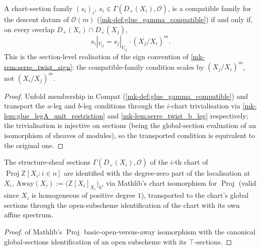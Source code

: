 \begin{lemma}\label{mk-lem:serre_twist_compatible_condition}
  \leanok

  A chart-section family \((s_i)_i\), \(s_i \in \Gamma(D_+(X_i), \mathcal O)\),
  is a compatible family for the descent datum of \(\mathcal O(m)\)
  (\ref{mk-def:glue_gamma_compatible}) if and only if, on every overlap
  \(D_+(X_i) \cap D_+(X_j)\),
  \[
    s_i|_{V_{ij}} = s_j|_{V_{ij}} \cdot (X_j/X_i)^m .
  \]
  This is the section-level realisation of the sign convention of
  \ref{mk-rem:serre_twist_sign}: the compatible-family condition scales by
  \((X_j/X_i)^m\), not \((X_i/X_j)^m\).
\end{lemma}
\begin{proof}
  \leanok{}
  Unfold membership in \(\mathrm{Compat}\) (\ref{mk-def:glue_gamma_compatible})
  and transport the \(a\)-leg and \(b\)-leg conditions through the
  \(i\)-chart trivialisation via \ref{mk-lem:glue_legA_unit_restriction} and
  \ref{mk-lem:serre_twist_b_leg} respectively; the trivialisation is injective
  on sections (being the global-section evaluation of an isomorphism of
  sheaves of modules), so the transported condition is equivalent to the
  original one.
\end{proof}

\begin{definition}\label{mk-def:chart_sections_away}
  \leanok

  The structure-sheaf sections \(\Gamma(D_+(X_i), \mathcal O)\) of the
  \(i\)-th chart of \(\operatorname{Proj} \mathbb Z[X_i : i \in n]\) are
  identified with the degree-zero part of the localisation at \(X_i\),
  \(\mathrm{Away}(X_i) := \bigl(\mathbb Z[X_i]_{X_i}\bigr)_0\), via Mathlib's
  chart isomorphism for \(\operatorname{Proj}\) (valid since \(X_i\) is
  homogeneous of positive degree \(1\)), transported to the chart's global
  sections through the open-subscheme identification of the chart with its
  own affine spectrum.
\end{definition}
\begin{proof}
  \leanokComposite of Mathlib's \(\operatorname{Proj}\) basic-open-versus-away
  isomorphism with the canonical global-sections identification of an open
  subscheme with its \(\top\)-sections.
\end{proof}

